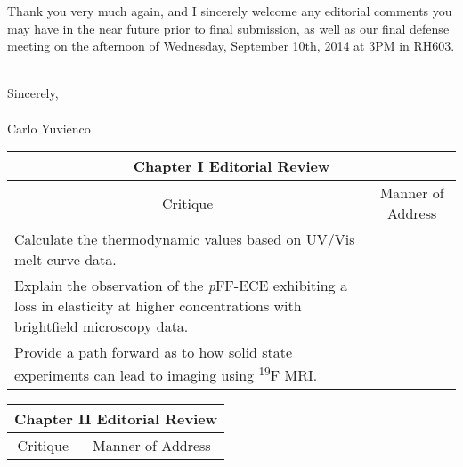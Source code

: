 Thank you very much again, and I sincerely welcome any editorial comments you
may have in the near future prior to final submission, as well as our final
defense meeting on the afternoon of Wednesday, September 10th, 2014 at 3PM in
RH603.

\hspace{0pt}\\
Sincerely,
\hspace{0pt}\\
\hspace{0pt}\\
Carlo Yuvienco

\begin{landscape}
\renewcommand{\arraystretch}{1.5}
\begin{table}[h!]
    \centering
    \begin{tabular}{ p{} p{} }
    \hline
    \multicolumn{2}{c}{Chapter I Editorial Review} \\
    \hline
    \multicolumn{1}{c}{Critique} &
    \multicolumn{1}{c}{Manner of Address} \\
    \hline
    
    Calculate the thermodynamic values based on UV/Vis melt curve data.
    &

    \\

    Explain the observation of the \emph{p}FF-ECE exhibiting a loss in
    elasticity at higher concentrations with brightfield microscopy data.
    &
    \\

    Provide a path forward as to how solid state experiments can lead to imaging
    using \textsuperscript{19}F MRI.
    &
    \\

    \hline
\end{tabular}
\end{table}
\renewcommand{\arraystretch}{1.5}
\begin{table}[h!]
    \centering
    \begin{tabular}{ p{} p{} }
    \hline
    \multicolumn{2}{c}{Chapter II Editorial Review} \\
    \hline
    \multicolumn{1}{c}{Critique} &
    \multicolumn{1}{c}{Manner of Address} \\
    \hline
    

\end{tabular}
\end{table}
\end{landscape}
